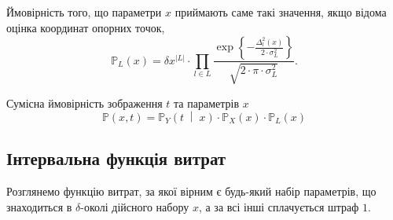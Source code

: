 Ймовірність того, що параметри $x$ приймають саме такі значення,
якщо відома оцінка координат опорних точок,
\begin{equation*}
  \mathbb{P}_L\left( x \right)
  = \delta x^{\left| L \right|} \cdot \prod_{l \in L}
      \frac{\exp{\left\{- \frac{\Delta_l^2\left( x \right)}
           {2 \cdot \sigma^2_L} \right\}}}
           {\sqrt{2 \cdot \pi \cdot \sigma^2_L}}.
\end{equation*}

Сумісна ймовірність зображення $t$ та параметрів $x$
\begin{equation*}
  \mathbb{P}\left( x, t \right)
  = \mathbb{P}_Y\left( t \;\middle|\; x \right)
    \cdot \mathbb{P}_X\left( x \right)
    \cdot \mathbb{P}_L\left( x \right)
\end{equation*}

\subsection{Інтервальна функція витрат}

Розглянемо функцію витрат,
за якої вірним є будь-який набір параметрів,
що знаходиться в $\delta$-околі дійсного набору $x$,
а за всі інші сплачується штраф $1$.

